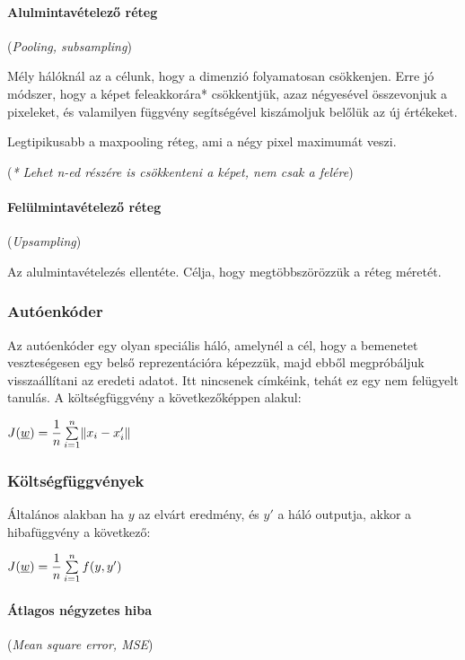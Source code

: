 \paragraph{Alulmintavételező réteg} (\textit{Pooling, subsampling})


Mély hálóknál az a célunk, hogy a dimenzió folyamatosan csökkenjen. Erre 
jó módszer, hogy a képet feleakkorára* csökkentjük, azaz négyesével összevonjuk
a pixeleket, és valamilyen függvény segítségével kiszámoljuk belőlük az új értékeket.


Legtipikusabb a maxpooling réteg, ami a négy pixel maximumát veszi.

(\textit{* Lehet n-ed részére is csökkenteni a képet, nem csak a felére})

\paragraph{Felülmintavételező réteg} (\textit{Upsampling})


Az alulmintavételezés ellentéte. Célja, hogy megtöbbszörözzük a réteg
méretét.




\subsubsection{Autóenkóder}

Az autóenkóder egy olyan speciális háló, amelynél a cél, hogy 
a bemenetet veszteségesen egy belső reprezentációra képezzük,
majd ebből megpróbáljuk visszaállítani az eredeti adatot.
Itt nincsenek címkéink, tehát ez egy nem felügyelt tanulás.
A költségfüggvény a következőképpen alakul:


$ J(\underline{w}) = \dfrac{1}{n} \sum\limits_{{i}=1}^{n}\lVert x_i - x_i'\rVert $




\subsubsection{Költségfüggvények}

Általános alakban ha $ y $ az elvárt eredmény, és $ y' $ a háló
outputja, akkor a hibafüggvény a következő:

$ J(\underline{w}) = \dfrac{1}{n} \sum\limits_{{i}=1}^{n} f(y, y') $


\paragraph{Átlagos négyzetes hiba} (\textit{Mean square error, MSE})


